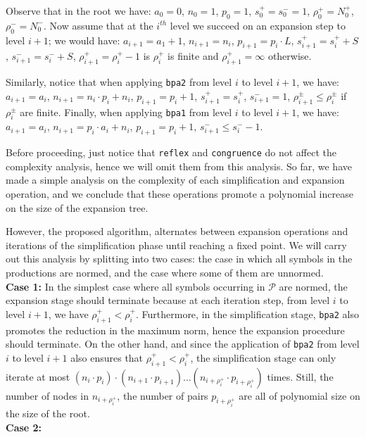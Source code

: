 Observe that in the root we have: $a_0=0$, $n_0=1$, $p_0=1$,
$s_0^+=s_0^-=1$, $\rho_0^+=N_0^+$, $\rho_0^-=N_0^-$. Now assume 
that at the $i^{th}$ level we succeed on an expansion step to
level $i+1$;
we would have: $a_{i+1}=a_1+1$, $n_{i+1}=n_i$, $p_{i+1}=p_i\cdot L$,
$s_{i+1}^+=s_i^++S$, $s_{i+1}^-=s_i^-+S$, $\rho_{i+1}^+=\rho_i^+-1$ 
is $\rho_i^+$ is finite and  $\rho_{i+1}^+ = \infty$ otherwise.

Similarly, notice that when applying \lstinline{bpa2} from level $i$
to level $i+1$, we have: $a_{i+1}=a_i$, $n_{i+1} = n_i\cdot p_i + n_i$,
$p_{i+1}=p_i+1$, $s_{i+1}^+=s_i^+$, $s_{i+1}^-=1$, 
$\rho_{i+1}^\pm\leq \rho_i^\pm$ if $\rho_i^\pm$ are finite. 
Finally, when applying \lstinline{bpa1} from level $i$
to level $i+1$, we have: $a_{i+1}=a_i$, $n_{i+1} = p_i \cdot a_i+n_i$,
$p_{i+1}=p_i+1$, $s_{i+1}^- \leq s_i^- - 1$.

Before proceeding, just notice that \lstinline{reflex} and 
\lstinline{congruence} do not affect the complexity analysis, hence 
we will omit them from this analysis.
So far, we have made a simple analysis on the complexity of each 
simplification and expansion operation, and we conclude that
these operations promote a polynomial increase on the size of the
expansion tree. 

However, the proposed algorithm, alternates between expansion 
operations and iterations of the simplification phase until 
reaching a fixed point. We will carry out this analysis by 
splitting into two cases: the case in which all symbols 
in the productions are normed, and the case where some
of them are unnormed.\\

\noindent\textbf{Case 1:} In the simplest case where all symbols
occurring in $\mathcal{P}$ are normed, the expansion stage should 
terminate because at each iteration step, from level $i$ to level
$i+1$, we have $\rho_{i+1}^+ < \rho_i^+$. Furthermore, in the 
simplification stage, \lstinline{bpa2} also promotes the reduction 
in the maximum norm, hence the expansion procedure should terminate.
On the other hand, and since the application of \lstinline{bpa2} from 
level $i$ to level $i+1$ also ensures that $\rho_{i+1}^+ < \rho_i^+$,
the simplification stage can only iterate at most 
$(n_i\cdot p_i)\cdot (n_{i+1}\cdot p_{i+1})\ldots (n_{i+\rho_i^+}\cdot
p_{i+\rho_i^+})$ times. Still, the number of nodes in $n_{i+\rho_i^+}$, 
the number of pairs $p_{i+\rho_i^+}$ are all of polynomial size on the 
size of the root.\\

\noindent\textbf{Case 2:} 





























